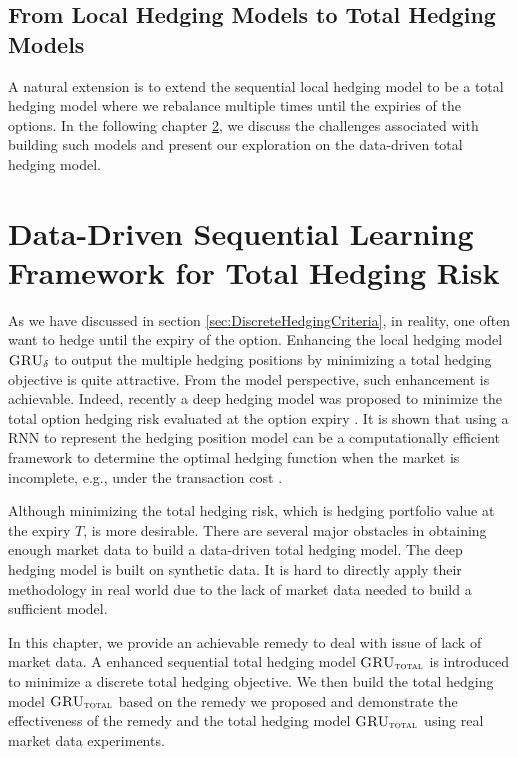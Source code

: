 \documentclass[letterpaper,12pt,titlepage,oneside,final]{book}
\numberwithin{equation}{section}
\theoremstyle{definition}
\newcommand{\model}{\textsc{GRU}_\delta}
\newcommand{\modelT}{\textsc{GRU}_{\textsc{total}}}
\begin{document}
\section{From Local Hedging Models to Total Hedging Models}\label{sec:Localconclusion}
A natural extension  is to extend the sequential local hedging model to be a total hedging model where we rebalance multiple times until the expiries of the options. In the following chapter \ref{sec:RNNTotal}, we discuss the challenges associated with building such models and present our exploration on the data-driven total hedging model.

\chapter{Data-Driven Sequential Learning Framework for Total Hedging Risk}
\label{sec:RNNTotal}
As we have discussed in section \ref{sec:DiscreteHedgingCriteria}, in reality, one often want to hedge until the expiry of the option. Enhancing the local hedging model $\model$ to output the multiple hedging positions by minimizing a total hedging objective is quite attractive. From the model perspective, such enhancement is achievable. Indeed, recently a deep hedging model was proposed to minimize the total option hedging risk evaluated at the option expiry  \citep{buehler2019deep}. It is shown  that using a RNN to represent the hedging position model can be a computationally efficient framework to determine the optimal hedging function when the market is incomplete, e.g., under the transaction cost \citep{buehler2019deep}.

Although minimizing the total hedging risk, which is hedging portfolio value at the expiry $T$, is more desirable. There are several major obstacles in obtaining enough market data to build a data-driven total hedging model. The deep hedging model \citep{buehler2019deep} is built on synthetic data. It is hard to directly apply their methodology in real world due to the lack of market data needed to build a sufficient model. 

In this chapter, we  provide an achievable remedy  to deal with issue of lack of market data.  A enhanced  sequential total hedging model $\modelT$ is introduced to minimize a discrete total hedging objective. We then build the total hedging model $\modelT$ based on the remedy we proposed and demonstrate the effectiveness of the remedy and the  total hedging model $\modelT$ using real market data experiments.  
\end{document}
